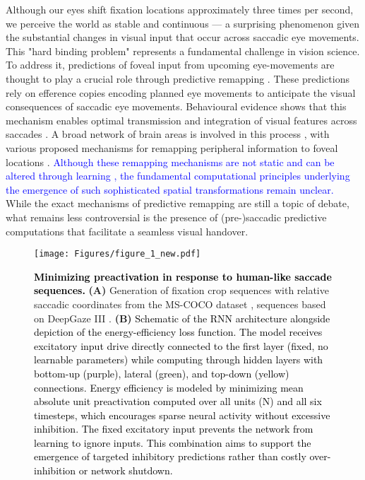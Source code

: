 \documentclass[10pt,letterpaper]{article}
\begin{document}
Although our eyes shift fixation locations approximately three times per second,
we perceive the world as stable and continuous — a surprising phenomenon given the
substantial changes in visual input that occur across saccadic eye movements. 
This "hard binding problem" \citep{cavanagh_visual_2010} represents a fundamental 
challenge in vision science. To address it, predictions of foveal input from 
upcoming eye-movements are thought to play a crucial role through predictive 
remapping \citep{golomb_visual_2021}. These predictions rely on efference copies 
encoding planned eye movements to anticipate the visual consequences of saccadic 
eye movements. Behavioural evidence shows that this mechanism enables optimal 
transmission and integration of visual features across saccades 
\citep{fabius_low-level_2020, ganmor_near-optimal_2015, harrison_visual_2013, 
he_predictive_2017, wolf_trans-saccadic_2015}. A broad network of brain areas is 
involved in this process \citep{duhamel_updating_1992, knapen_oculomotor_2016, 
nakamura_updating_2002, neupane_two_2016, umeno_spatial_1997, walker_neurons_1995}, 
with various proposed mechanisms for remapping peripheral information to foveal 
locations \citep{arkesteijn_limits_2019, cavanagh_visual_2010, golomb_visual_2021, 
melcher_predictive_2007, neupane_two_2016, neupane_perisaccadic_2020, rolfs2015attention}. 
\textcolor{blue}{Although these remapping mechanisms are not static and can be altered through learning 
\citep{masselink_visuomotor_2021}, the fundamental computational principles 
underlying the emergence of such sophisticated spatial transformations remain 
unclear.} While the exact mechanisms of predictive remapping are still a topic of debate, what remains less controversial is the presence of (pre-)saccadic predictive computations that facilitate a seamless visual handover.

\begin{figure*}[ht!]
\begin{center}
\texttt{[image: Figures/figure\_1\_new.pdf]}
\end{center}
\caption{\textbf{\textcolor{black}{Minimizing preactivation in response to human-like saccade sequences.}} \textbf{(A)} Generation of fixation crop sequences with relative saccadic coordinates from the MS-COCO dataset \citep{lin_microsoft_2015}, sequences based on DeepGaze III \citep{kummerer_deepgaze_2022}. \textbf{(B)} \textcolor{black}{Schematic of the RNN architecture alongside depiction of the energy-efficiency loss function. The model receives excitatory input drive directly connected to the first layer (fixed, no learnable parameters) while computing through hidden layers with bottom-up (purple), lateral (green), and top-down (yellow) connections. Energy efficiency is modeled by minimizing mean absolute unit preactivation computed over all units (N) and all six timesteps, which encourages sparse neural activity without excessive inhibition. The fixed excitatory input prevents the network from learning to ignore inputs. This combination aims to support the emergence of targeted inhibitory predictions rather than costly over-inhibition or network shutdown.} }
\label{figure1}
\end{figure*}
\end{document}
